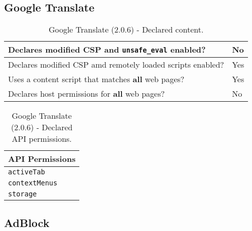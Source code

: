 \subsection{Google Translate}

\begin{table}[h]
	\centering
	\begin{tabular}{|l|l|} \hline
		Declares modified CSP and \texttt{unsafe\_eval} enabled? & No \\ \hline
		Declares modified CSP amd remotely loaded scripts enabled? & Yes \\ \hline
		Uses a content script that matches \textbf{all} web pages? & Yes \\ \hline
		Declares host permissions for \textbf{all} web pages? & No \\ \hline
	\end{tabular}
	\caption{Google Translate (2.0.6) - Declared content.}
\end{table}
\begin{table}[h]
	\centering
	\begin{tabular}{|l|} \hline
		\textbf{API Permissions} \\ \hline
		\texttt{activeTab} \\
		\texttt{contextMenus} \\
		\texttt{storage} \\
		\hline
	\end{tabular}
	\caption{Google Translate (2.0.6) - Declared API permissions.}
\end{table}
\newpage
\subsection{AdBlock}

